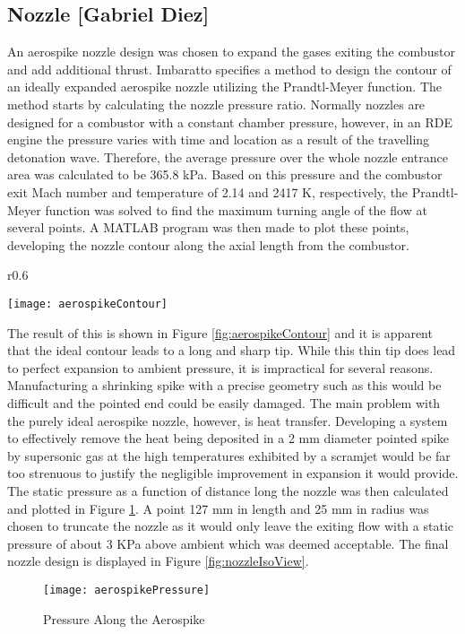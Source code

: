 \subsection{Nozzle [Gabriel Diez]}

An aerospike nozzle design was chosen to expand the gases exiting the combustor and add additional thrust. Imbaratto \cite{imbaratto} specifies a method to design the contour of an ideally expanded aerospike nozzle utilizing the Prandtl-Meyer function. The method starts by calculating the nozzle pressure ratio. Normally nozzles are designed for a combustor with a constant chamber pressure, however, in an RDE engine the pressure varies with time and location as a result of the travelling detonation wave. Therefore, the average pressure over the whole nozzle entrance area was calculated to be 365.8 kPa. Based on this pressure and the combustor exit Mach number and temperature of 2.14 and 2417 K, respectively, the Prandtl-Meyer function was solved to find the maximum turning angle of the flow at several points. A MATLAB program was then made to plot these points, developing the nozzle contour along the axial length from the combustor.

\begin{wrapfigure}{r}{0.6\textwidth}
\begin{center}
\texttt{[image: aerospikeContour]}
\caption{Aerospike Contour}
\label{fig:aerospikeContour}
\end{center}
\end{wrapfigure}
 
The result of this is shown in Figure \ref{fig:aerospikeContour} and it is apparent that the ideal contour leads to a long and sharp tip. While this thin tip does lead to perfect expansion to ambient pressure, it is impractical for several reasons. Manufacturing a shrinking spike with a precise geometry such as this would be difficult and the pointed end could be easily damaged. The main problem with the purely ideal aerospike nozzle, however, is heat transfer. Developing a system to effectively remove the heat being deposited in a 2 mm diameter pointed spike by supersonic gas at the high temperatures exhibited by a scramjet would be far too strenuous to justify the negligible improvement in expansion it would provide. The static pressure as a function of distance long the nozzle was then calculated and plotted in Figure \ref{fig:aerospikePressure}. A point 127 mm in length and 25 mm in radius was chosen to truncate the nozzle as it would only leave the exiting flow with a static pressure of about 3 KPa above ambient which was deemed acceptable. The final nozzle design is displayed in Figure \ref{fig:nozzleIsoView}.

\begin{figure}[H]
\begin{center}
\texttt{[image: aerospikePressure]}
\caption{Pressure Along the Aerospike}
\label{fig:aerospikePressure}
\end{center}
\end{figure}


